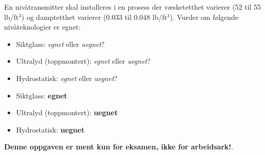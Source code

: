 

En nivåtransmitter skal installeres i en prosess der væsketetthet varierer (52 til 55 lb/ft$^{3}$) og damptetthet varierer (0.033 til 0.048 lb/ft$^{3}$). Vurder om følgende nivåteknologier er egnet:

\begin{itemize}
\item{} Siktglass: {\it egnet} eller {\it uegnet}?
\vskip 10pt
\item{} Ultralyd (toppmontert): {\it egnet} eller {\it uegnet}?
\vskip 10pt
\item{} Hydrostatisk: {\it egnet} eller {\it uegnet}?
\end{itemize}







\begin{itemize}
\item{} Siktglass: {\bf egnet}
\vskip 10pt
\item{} Ultralyd (toppmontert): {\bf uegnet}
\vskip 10pt
\item{} Hydrostatisk: {\bf uegnet}
\end{itemize}







{\bf Denne oppgaven er ment kun for eksamen, ikke for arbeidsark!}.


